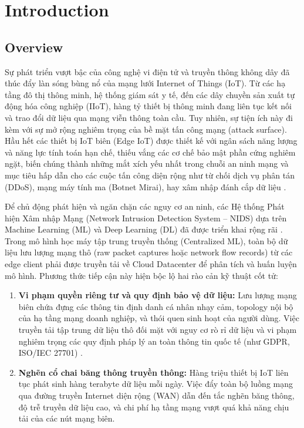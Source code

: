 \chapter{Introduction}
\label{chap:intro}

\section{Overview}
\label{sec:intro_overview}
Sự phát triển vượt bậc của công nghệ vi điện tử và truyền thông không dây đã thúc đẩy làn sóng bùng nổ của mạng lưới Internet of Things (IoT). Từ các hạ tầng đô thị thông minh, hệ thống giám sát y tế, đến các dây chuyền sản xuất tự động hóa công nghiệp (IIoT), hàng tỷ thiết bị thông minh đang liên tục kết nối và trao đổi dữ liệu qua mạng viễn thông toàn cầu. Tuy nhiên, sự tiện ích này đi kèm với sự mở rộng nghiêm trọng của bề mặt tấn công mạng (attack surface). Hầu hết các thiết bị IoT biên (Edge IoT) được thiết kế với ngân sách năng lượng và năng lực tính toán hạn chế, thiếu vắng các cơ chế bảo mật phần cứng nghiêm ngặt, biến chúng thành những mắt xích yếu nhất trong chuỗi an ninh mạng và mục tiêu hấp dẫn cho các cuộc tấn công diện rộng như từ chối dịch vụ phân tán (DDoS), mạng máy tính ma (Botnet Mirai), hay xâm nhập đánh cắp dữ liệu \cite{neto2023ciciot2023}.

Để chủ động phát hiện và ngăn chặn các nguy cơ an ninh, các Hệ thống Phát hiện Xâm nhập Mạng (Network Intrusion Detection System -- NIDS) dựa trên Machine Learning (ML) và Deep Learning (DL) đã được triển khai rộng rãi \cite{huang2022federated}. Trong mô hình học máy tập trung truyền thống (Centralized ML), toàn bộ dữ liệu lưu lượng mạng thô (raw packet captures hoặc network flow records) từ các edge client phải được truyền tải về Cloud Datacenter để phân tích và huấn luyện mô hình. Phương thức tiếp cận này hiện bộc lộ hai rào cản kỹ thuật cốt tử:
\begin{enumerate}
    \item \textbf{Vi phạm quyền riêng tư và quy định bảo vệ dữ liệu:} Lưu lượng mạng biên chứa đựng các thông tin định danh cá nhân nhạy cảm, topology nội bộ của hạ tầng mạng doanh nghiệp, và thói quen sinh hoạt của người dùng. Việc truyền tải tập trung dữ liệu thô đối mặt với nguy cơ rò rỉ dữ liệu và vi phạm nghiêm trọng các quy định pháp lý an toàn thông tin quốc tế (như GDPR, ISO/IEC 27701) \cite{yang2019federated}.
    \item \textbf{Nghẽn cổ chai băng thông truyền thông:} Hàng triệu thiết bị IoT liên tục phát sinh hàng terabyte dữ liệu mỗi ngày. Việc đẩy toàn bộ luồng mạng qua đường truyền Internet diện rộng (WAN) dẫn đến tắc nghẽn băng thông, độ trễ truyền dữ liệu cao, và chi phí hạ tầng mạng vượt quá khả năng chịu tải của các nút mạng biên.
\end{enumerate}

